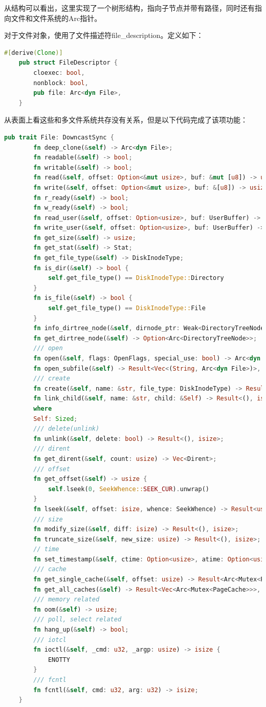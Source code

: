 从结构可以看出，这里实现了一个树形结构，指向子节点并带有路径，同时还有指向文件和文件系统的Arc指针。

对于文件对象，使用了文件描述符file\_description。定义如下：

\begin{lstlisting}[language={Rust},caption={DirectoryTreeNode}]
	#[derive(Clone)]
	pub struct FileDescriptor {
		cloexec: bool,
		nonblock: bool,
		pub file: Arc<dyn File>,
	}
\end{lstlisting}

从表面上看这些和多文件系统共存没有关系，但是以下代码完成了该项功能：
\begin{lstlisting}[language={Rust}, caption={file\_trait}]
	pub trait File: DowncastSync {
		fn deep_clone(&self) -> Arc<dyn File>;
		fn readable(&self) -> bool;
		fn writable(&self) -> bool;
		fn read(&self, offset: Option<&mut usize>, buf: &mut [u8]) -> usize;
		fn write(&self, offset: Option<&mut usize>, buf: &[u8]) -> usize;
		fn r_ready(&self) -> bool;
		fn w_ready(&self) -> bool;
		fn read_user(&self, offset: Option<usize>, buf: UserBuffer) -> usize;
		fn write_user(&self, offset: Option<usize>, buf: UserBuffer) -> usize;
		fn get_size(&self) -> usize;
		fn get_stat(&self) -> Stat;
		fn get_file_type(&self) -> DiskInodeType;
		fn is_dir(&self) -> bool {
			self.get_file_type() == DiskInodeType::Directory
		}
		fn is_file(&self) -> bool {
			self.get_file_type() == DiskInodeType::File
		}
		fn info_dirtree_node(&self, dirnode_ptr: Weak<DirectoryTreeNode>);
		fn get_dirtree_node(&self) -> Option<Arc<DirectoryTreeNode>>;
		/// open
		fn open(&self, flags: OpenFlags, special_use: bool) -> Arc<dyn File>;
		fn open_subfile(&self) -> Result<Vec<(String, Arc<dyn File>)>, isize>;
		/// create
		fn create(&self, name: &str, file_type: DiskInodeType) -> Result<Arc<dyn File>, isize>;
		fn link_child(&self, name: &str, child: &Self) -> Result<(), isize>
		where
		Self: Sized;
		/// delete(unlink)
		fn unlink(&self, delete: bool) -> Result<(), isize>;
		/// dirent
		fn get_dirent(&self, count: usize) -> Vec<Dirent>;
		/// offset
		fn get_offset(&self) -> usize {
			self.lseek(0, SeekWhence::SEEK_CUR).unwrap()
		}
		fn lseek(&self, offset: isize, whence: SeekWhence) -> Result<usize, isize>;
		/// size
		fn modify_size(&self, diff: isize) -> Result<(), isize>;
		fn truncate_size(&self, new_size: usize) -> Result<(), isize>;
		// time
		fn set_timestamp(&self, ctime: Option<usize>, atime: Option<usize>, mtime: Option<usize>);
		/// cache
		fn get_single_cache(&self, offset: usize) -> Result<Arc<Mutex<PageCache>>, ()>;
		fn get_all_caches(&self) -> Result<Vec<Arc<Mutex<PageCache>>>, ()>;
		/// memory related
		fn oom(&self) -> usize;
		/// poll, select related
		fn hang_up(&self) -> bool;
		/// iotcl
		fn ioctl(&self, _cmd: u32, _argp: usize) -> isize {
			ENOTTY
		}
		/// fcntl
		fn fcntl(&self, cmd: u32, arg: u32) -> isize;
	}
\end{lstlisting}

